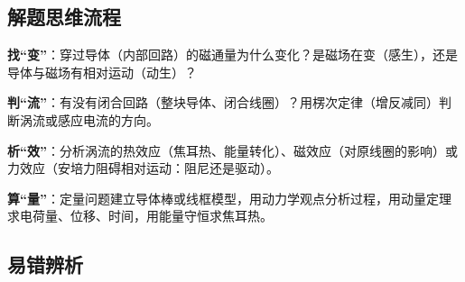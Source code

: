 \subsection{解题思维流程}

\begin{fangfa}
\begin{steps}
  \item \textbf{找“变”}：穿过导体（内部回路）的磁通量为什么变化？是磁场在变（感生），还是导体与磁场有相对运动（动生）？
  \item \textbf{判“流”}：有没有闭合回路（整块导体、闭合线圈）？用楞次定律（增反减同）判断涡流或感应电流的方向。
  \item \textbf{析“效”}：分析涡流的热效应（焦耳热、能量转化）、磁效应（对原线圈的影响）或力效应（安培力阻碍相对运动：阻尼还是驱动）。
  \item \textbf{算“量”}：定量问题建立导体棒或线框模型，用动力学观点分析过程，用动量定理求电荷量、位移、时间，用能量守恒求焦耳热。
\end{steps}
\end{fangfa}

\subsection{易错辨析}

